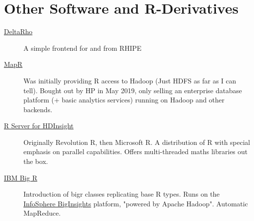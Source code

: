 \documentclass[a4paper, 11pt]{article}
\begin{document}
\section{Other Software and R-Derivatives}
\label{sec:orgdcdf1cb}
\begin{description}
\item[{\href{http://deltarho.org}{DeltaRho}}] A simple frontend for and from RHIPE
\item[{\href{https://en.wikipedia.org/wiki/MapR}{MapR}}] Was initially providing R access to Hadoop (Just HDFS as far
as I can tell). Bought out by HP in May 2019, only selling an
enterprise database platform (+ basic analytics services) running
on Hadoop and other backends.
\item[{\href{https://azure.microsoft.com/en-us/services/hdinsight/r-server/\#security}{R Server for HDInsight}}] Originally Revolution R, then Microsoft R.
A distribution of R with special emphasis on parallel
capabilities. Offers multi-threaded maths libraries out the box.
\item[{\href{https://www.ibm.com/support/knowledgecenter/SSPT3X\_3.0.0/com.ibm.swg.im.infosphere.biginsights.analyze.doc/doc/t\_overview\_bigr.html}{IBM Big R}}] Introduction of bigr classes replicating base R types.
Runs on the \href{https://www.ibm.com/support/knowledgecenter/SSPT3X\_3.0.0/com.ibm.swg.im.infosphere.biginsights.welcome.doc/doc/welcome.html}{InfoSphere BigInsights} platform, "powered by Apache
Hadoop". Automatic MapReduce.
\end{description}
\end{document}
